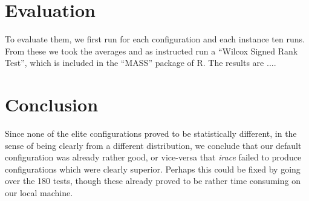 \documentclass [11pt]{article}
\begin{document}
\section{Evaluation}

To evaluate them, we first run for each configuration and each instance ten runs. From these we took the averages and as instructed run a ``Wilcox Signed Rank Test'', which is included in the ``MASS'' package of R. The results are .... 

\section{Conclusion}
Since none of the elite configurations proved to be statistically different, in the sense of being clearly from a different distribution, we conclude that our default configuration was already rather good, or vice-versa that \emph{irace} failed to produce configurations which were clearly superior. Perhaps this could be fixed by going over the 180 tests, though these already proved to be rather time consuming on our local machine. 
\end{document}
